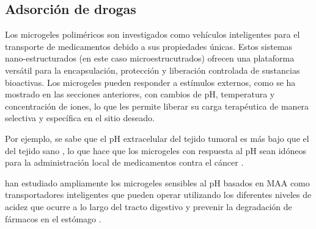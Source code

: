 \subsection{Adsorci\'on de drogas}\label{sec:gel:ads-drogas}


Los microgeles polim\'ericos son investigados como veh\'iculos inteligentes para el transporte de medicamentos debido a sus propiedades \'unicas. Estos sistemas nano-estructurados (en este caso microestrucutrados) ofrecen una plataforma vers\'atil para la encapsulaci\'on, protecci\'on y liberaci\'on controlada de sustancias bioactivas. Los microgeles pueden responder a est\'imulos externos, como se ha mostrado en las secciones anteriores,  con cambios de pH, temperatura y concentraci\'on de iones, lo que les permite liberar su carga terap\'eutica de manera selectiva y espec\'ifica en el sitio deseado. 

Por ejemplo, se sabe que el pH extracelular del tejido tumoral es m\'as bajo que el del tejido sano \cite{Gerweck1996}, lo que hace que los microgeles con respuesta al pH sean id\'oneos para la administraci\'on local de medicamentos contra el c\'ancer \cite{Dadsetan2013}.

 \citet{peppas2004hydrogels} han estudiado ampliamente los microgeles sensibles al pH basados en MAA como transportadores inteligentes que pueden operar utilizando los diferentes niveles de acidez que ocurre a lo largo del tracto digestivo y prevenir la degradaci\'on de f\'armacos en el est\'omago \cite{TorresLugo2002, Carr2010, DuranLobato2014, Sharpe2018}.

